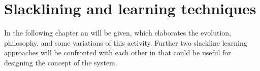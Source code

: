 \chapter{Slacklining and learning techniques}\label{3_slacklining}
In the following chapter an \textbf{} will be given, which elaborates the evolution, philosophy, and some variations of this activity. Further two slackline learning approaches will be confronted with each other in  \textbf{} that could be useful for designing the concept of the system.

 

 
  
 